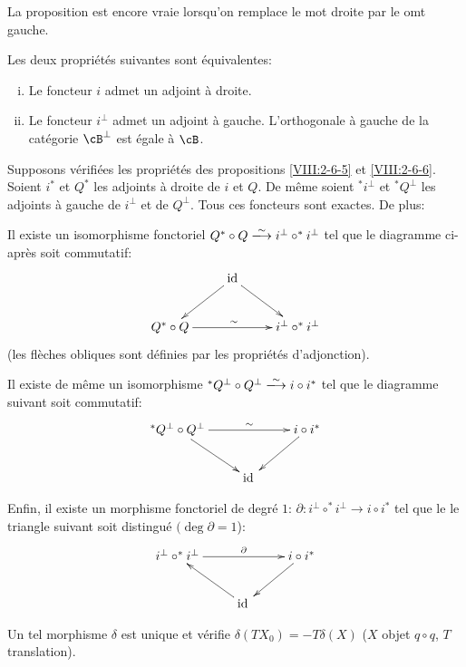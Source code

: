 La proposition est encore vraie lorsqu'on remplace le mot droite par le omt 
gauche. 





\begin{proposition}\label{VIII:2-6-6}
Les deux propriétés suivantes sont équivalentes: 
\begin{enumerate}[(i)]
  \item Le foncteur $i$ admet un adjoint à droite. 
  \item Le foncteur $i^\bot$ admet un adjoint à gauche. L'orthogonale à 
    gauche de la catégorie $\cB^\bot$ est égale à $\cB$. 
\end{enumerate}
\end{proposition}





\begin{proposition}\label{VIII:2-6-7}
Supposons vérifiées les propriétés des propositions \ref{VIII:2-6-5} et 
\ref{VIII:2-6-6}. Soient $i^\ast$ et $Q^\ast$ les adjoints à droite de $i$ et 
$Q$. De même soient $^\ast i^\bot$ et $^\ast Q^\bot$ les adjoints à gauche 
de $i^\bot$ et de $Q^\bot$. Tous ces foncteurs sont exactes. De plus: 

Il existe un isomorphisme fonctoriel 
$Q^\ast\circ Q\iso i^\bot\circ ^\ast i^\bot$ tel que le diagramme ci-après 
soit commutatif: 
\[\xymatrix{
  & \operatorname{id} \ar[dl] \ar[dr] \\
  Q^\ast \circ Q \ar[rr]^\sim 
    & & i^\bot\circ ^\ast i^\bot 
}\]
(les flèches obliques sont définies par les propriétés d'adjonction).

Il existe de même un isomorphisme 
$^\ast Q^\bot \circ Q^\bot \iso i\circ i^\ast$ tel que le diagramme suivant soit 
commutatif: 
\[\xymatrix{
  ^\ast Q^\bot\circ Q^\bot \ar[rr]^-\sim \ar[dr] 
    & & i\circ i^\ast \ar[dl] \\
  & \operatorname{id}{}
}\]

Enfin, il existe un morphisme fonctoriel de degré $1$: 
$\partial:i^\bot\circ ^\ast i^\bot \to i\circ i^\ast$ tel que le le triangle 
suivant soit distingué $(\deg\partial=1$): 
\[\xymatrix{
  i^\bot \circ ^\ast i^\bot \ar[rr]^-\partial 
    & & i\circ i^\ast \ar[dl] \\
  & \operatorname{id}{} \ar[ul] 
}\]

Un tel morphisme $\delta$ est unique et vérifie 
$\delta(T X_0) = - T \delta(X)$ ($X$ objet $q\circ q$, $T$ translation). 
\end{proposition}















